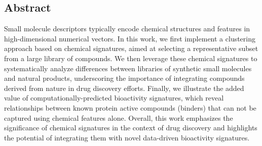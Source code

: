 \subsection{Abstract}

Small molecule descriptors typically encode chemical structures and features in high-dimensional numerical vectors. In this work, we first implement a clustering approach based on chemical signatures, aimed at selecting a representative subset from a large library of compounds. We then leverage these chemical signatures to systematically analyze differences between libraries of synthetic small molecules and natural products, underscoring the importance of integrating compounds derived from nature in drug discovery efforts. Finally, we illustrate the added value of computationally-predicted bioactivity signatures, which reveal relationships between known protein active compounds (binders) that can not be captured using chemical features alone. Overall, this work emphasizes the significance of chemical signatures in the context of drug discovery and highlights the potential of integrating them with novel data-driven bioactivity signatures. 
